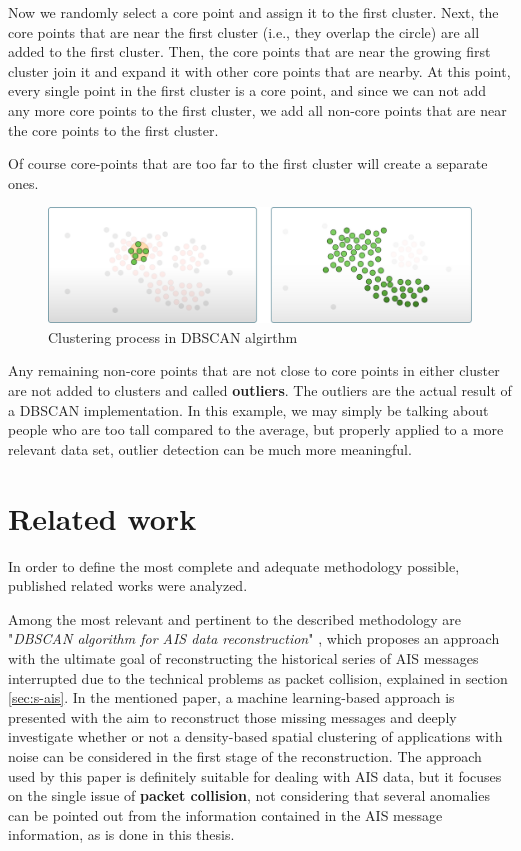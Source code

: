     Now we randomly select a core point and assign it to the first cluster. Next, the core points that are near the first cluster (i.e., they overlap the circle) are all added to the first cluster. Then, the core points that are near the growing first cluster join it and expand it with other core points that are nearby.
    At this point, every single point in the first cluster is a core point, and since we can not add any more core points to the first cluster, we add all non-core points that are near the core points to the first cluster.
    
    Of course core-points that are too far to the first cluster will create a separate ones.
    
    \begin{figure}[H]
        \centering
        \includegraphics[width=16cm]{Images/1/dbscan-ex-4.png}
        \caption{Clustering process in DBSCAN algirthm}
    \end{figure}
    
    Any remaining non-core points that are not close to core points in either cluster are not added to clusters and called \textbf{outliers}.
    The outliers are the actual result of a DBSCAN implementation. In this example, we may simply be talking about people who are too tall compared to the average, but properly applied to a more relevant data set, outlier detection can be much more meaningful.
    
\section{Related work}
\label{related-works}

In order to define the most complete and adequate methodology possible, published related works were analyzed.

Among the most relevant and pertinent to the described methodology are "\textit{DBSCAN algorithm for AIS data reconstruction}" \cite{dbscan_ais}, which proposes an approach with the ultimate goal of reconstructing the historical series of AIS messages interrupted due to the technical problems as packet collision, explained in section \ref{sec:s-ais}. In the mentioned paper, a machine learning-based approach is presented with the aim to reconstruct those missing messages and deeply investigate whether or not a density-based spatial clustering of applications with noise can be considered in the first stage of the reconstruction.
The approach used by this paper is definitely suitable for dealing with AIS data, but it focuses on the single issue of \textbf{packet collision}, not considering that several anomalies can be pointed out from the information contained in the AIS message information, as is done in this thesis.

